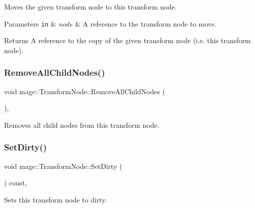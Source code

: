 Moves the given transform node to this transform node.


\begin{DoxyParams}[1]{Parameters}
\mbox{\tt in}  & {\em node} & A reference to the transform node to move. \\
\hline
\end{DoxyParams}
\begin{DoxyReturn}{Returns}
A reference to the copy of the given transform node (i.\+e. this transform node). 
\end{DoxyReturn}
\hypertarget{structmage_1_1_transform_node_aae7e3f918bcf38bd16db8475c7797c0b}{}\label{structmage_1_1_transform_node_aae7e3f918bcf38bd16db8475c7797c0b} 
\subsubsection{\texorpdfstring{Remove\+All\+Child\+Nodes()}{RemoveAllChildNodes()}}
{\footnotesize\ttfamily void mage\+::\+Transform\+Node\+::\+Remove\+All\+Child\+Nodes (\begin{DoxyParamCaption}{ }\end{DoxyParamCaption})\hspace{0.3cm}{\ttfamily [private]}, {\ttfamily [noexcept]}}

Removes all child nodes from this transform node. \hypertarget{structmage_1_1_transform_node_aef6e402c69bb125b09925b7a5ca79b33}{}\label{structmage_1_1_transform_node_aef6e402c69bb125b09925b7a5ca79b33} 
\subsubsection{\texorpdfstring{Set\+Dirty()}{SetDirty()}}
{\footnotesize\ttfamily void mage\+::\+Transform\+Node\+::\+Set\+Dirty (\begin{DoxyParamCaption}{ }\end{DoxyParamCaption}) const\hspace{0.3cm}{\ttfamily [private]}, {\ttfamily [noexcept]}}

Sets this transform node to dirty. \hypertarget{structmage_1_1_transform_node_a1fee4f95234f13b7f8fae231ac58f423}{}\label{structmage_1_1_transform_node_a1fee4f95234f13b7f8fae231ac58f423} 
